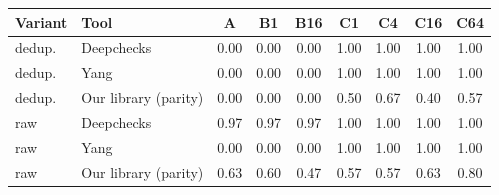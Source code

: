 \begin{tabular}{llccccccc}\toprule
Variant & Tool & A & B1 & B16 & C1 & C4 & C16 & C64\\\midrule
dedup. & Deepchecks & 0.00 & 0.00 & 0.00 & 1.00 & 1.00 & 1.00 & 1.00\\
dedup. & Yang & 0.00 & 0.00 & 0.00 & 1.00 & 1.00 & 1.00 & 1.00\\
dedup. & Our library (parity) & 0.00 & 0.00 & 0.00 & 0.50 & 0.67 & 0.40 & 0.57\\
raw & Deepchecks & 0.97 & 0.97 & 0.97 & 1.00 & 1.00 & 1.00 & 1.00\\
raw & Yang & 0.00 & 0.00 & 0.00 & 1.00 & 1.00 & 1.00 & 1.00\\
raw & Our library (parity) & 0.63 & 0.60 & 0.47 & 0.57 & 0.57 & 0.63 & 0.80\\
\bottomrule\end{tabular}
